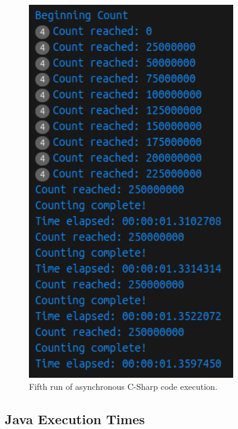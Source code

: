 \documentclass[12pt,a4paper]{article}
\begin{document}
\begin{figure}[htbp]
    \centering
    \includegraphics[width=0.8\textwidth]{../async_records/results_cs/result_5.png}
    \caption{Fifth run of asynchronous C-Sharp code execution.}
    \label{fig:C-Sharp-async-runtime-5}
\end{figure}

\clearpage
\subsection{Java Execution Times} 
\end{document}
